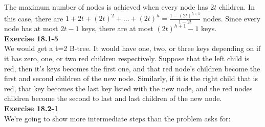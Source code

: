 \documentclass{article}
\begin{document}
The maximum number of nodes is achieved when every node has $2t$ children.  In this case, there are $1 + 2t + (2t)^2 + \ldots + (2t)^h = \frac{1-(2t)^{h+1}}{1-2t}$ nodes.  Since every node has at most $2t-1$ keys, there are at most $(2t)^{h+1} - 1$ keys. \\

\noindent\textbf{Exercise 18.1-5}\\

We would get a t=2 B-tree. It would have one, two, or three keys depending on if it has zero, one, or two red children respectively. Suppose that the left child is red, then it's keys becomes the first one, and that red node's children become the first and second children of the new node. Similarly, if it is the right child that is red, that key becomes the last key listed with the new node, and the red nodes children become the second to last and last children of the new node.\\

\noindent\textbf{Exercise 18.2-1}\\

We're going to show more intermediate steps than the problem asks for:







\end{document}
